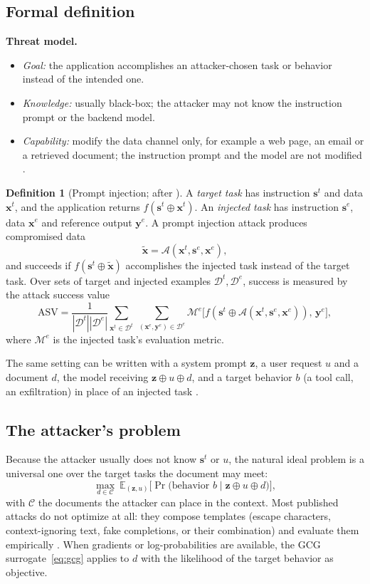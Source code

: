 \documentclass[10pt,a4paper]{extarticle}
\theoremstyle{definition}
\newtheorem{definition}{Definition}[section]
\newcommand{\D}{\mathcal{D}}
\newcommand{\threatmodel}[3]{%
\par\noindent\textbf{Threat model.}
\begin{itemize}[leftmargin=1.5em]
  \item \emph{Goal:} #1
  \item \emph{Knowledge:} #2
  \item \emph{Capability:} #3
\end{itemize}\par}
\begin{document}
\subsection{Formal definition}

\threatmodel{the application accomplishes an attacker-chosen task or behavior instead of the intended one.}{usually black-box; the attacker may not know the instruction prompt or the backend model.}{modify the data channel only, for example a web page, an email or a retrieved document; the instruction prompt and the model are not modified \citep{liu2024formalizing}.}

\begin{definition}[Prompt injection; after \citealp{liu2024formalizing}]\label{def:injection}
A \emph{target task} has instruction $\mathbf{s}^t$ and data $\mathbf{x}^t$, and the application returns $f(\mathbf{s}^t\oplus\mathbf{x}^t)$. An \emph{injected task} has instruction $\mathbf{s}^e$, data $\mathbf{x}^e$ and reference output $\mathbf{y}^e$. A prompt injection attack produces compromised data
\[
\tilde{\mathbf{x}}=\mathcal{A}(\mathbf{x}^t,\mathbf{s}^e,\mathbf{x}^e),
\]
and succeeds if $f(\mathbf{s}^t\oplus\tilde{\mathbf{x}})$ accomplishes the injected task instead of the target task. Over sets of target and injected examples $\D^t,\D^e$, success is measured by the attack success value
\[
\mathrm{ASV}=\frac{1}{|\D^t||\D^e|}\sum_{\mathbf{x}^t\in\D^t}\ \sum_{(\mathbf{x}^e,\mathbf{y}^e)\in\D^e}\mathcal{M}^e\big[f(\mathbf{s}^t\oplus\mathcal{A}(\mathbf{x}^t,\mathbf{s}^e,\mathbf{x}^e)),\,\mathbf{y}^e\big],
\]
where $\mathcal{M}^e$ is the injected task's evaluation metric.
\end{definition}

The same setting can be written with a system prompt $\mathbf{z}$, a user request $u$ and a document $d$, the model receiving $\mathbf{z}\oplus u\oplus d$, and a target behavior $b$ (a tool call, an exfiltration) in place of an injected task \citep{greshake2023not}.

\subsection{The attacker's problem}

Because the attacker usually does not know $\mathbf{s}^t$ or $u$, the natural ideal problem is a universal one over the target tasks the document may meet:
\[
\max_{d\in\mathcal{C}}\ \mathbb{E}_{(\mathbf{z},u)}\Big[\Pr\big(\text{behavior } b \mid \mathbf{z}\oplus u\oplus d\big)\Big],
\]
with $\mathcal{C}$ the documents the attacker can place in the context. Most published attacks do not optimize at all: they compose templates (escape characters, context-ignoring text, fake completions, or their combination) and evaluate them empirically \citep{liu2024formalizing}. When gradients or log-probabilities are available, the GCG surrogate~\eqref{eq:gcg} applies to $d$ with the likelihood of the target behavior as objective.
\end{document}
